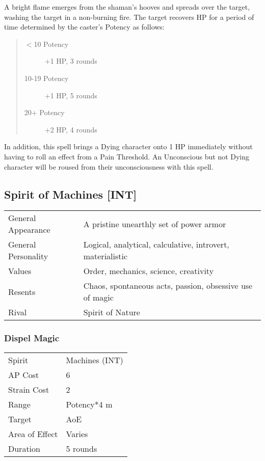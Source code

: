\documentclass[11pt,a4paper,twocolumn]{book}
\begin{document}
\medskip

A bright flame emerges from the shaman's hooves and spreads over the target, washing the target in a non-burning fire. The target recovers HP for a period of time determined by the caster's Potency as follows:

\begin{quote}
	\begin{description}
		\item[$<$10 Potency] 	+1 HP, 3 rounds
		\item[10-19 Potency] 	+1 HP, 5 rounds
		\item[20+ Potency] 		+2 HP, 4 rounds
	\end{description}	
\end{quote}

In addition, this spell brings a Dying character onto 1 HP immediately without having to roll an effect from a Pain Threshold. An Unconscious but not Dying character will be roused from their unconsciousness with this spell.

\subsection*{Spirit of Machines [INT]}
{
	\begin{tabu} to 75mm{| X[l,4] | X[l,8] |}
		\hline
		General Appearance  & A pristine unearthly set of power armor                    \\
		General Personality & Logical, analytical, calculative, introvert, materialistic \\
		Values              & Order, mechanics, science, creativity                      \\
		Resents             & Chaos, spontaneous acts, passion, obsessive use of magic   \\
		Rival               & Spirit of Nature                                           \\ \hline
	\end{tabu}
	
}

\medskip

\subsubsection*{Dispel Magic}
{
	\begin{tabu} to 75mm{| X[l,4] | X[l,7] |}
		\hline
		Spirit         & Machines (INT) \\
		AP Cost        & 6              \\
		Strain Cost    & 2              \\
		Range          & Potency*4 m    \\
		Target         & AoE            \\
		Area of Effect & Varies         \\
		Duration       & 5 rounds       \\ \hline
	\end{tabu}
	
}
\end{document}
